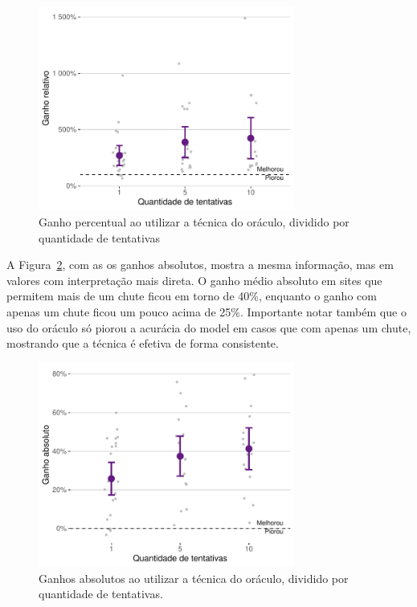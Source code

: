 \documentclass[12pt,twoside,brazilian]{book}
\begin{document}
\begin{figure}

{\centering \includegraphics[width=0.75\textwidth,height=\textheight]{./resultados_files/figure-pdf/fig-simulacao-geral-ntry-relativo-1.pdf}

}

\caption{\label{fig-simulacao-geral-ntry-relativo}Ganho percentual ao
utilizar a técnica do oráculo, dividido por quantidade de tentativas}

\end{figure}

A Figura~\ref{fig-simulacao-geral-ntry-absoluto}, com as os ganhos
absolutos, mostra a mesma informação, mas em valores com interpretação
mais direta. O ganho médio absoluto em sites que permitem mais de um
chute ficou em torno de 40\%, enquanto o ganho com apenas um chute ficou
um pouco acima de 25\%. Importante notar também que o uso do oráculo só
piorou a acurácia do model em casos que com apenas um chute, mostrando
que a técnica é efetiva de forma consistente.

\begin{figure}

{\centering \includegraphics[width=0.75\textwidth,height=\textheight]{./resultados_files/figure-pdf/fig-simulacao-geral-ntry-absoluto-1.pdf}

}

\caption{\label{fig-simulacao-geral-ntry-absoluto}Ganhos absolutos ao
utilizar a técnica do oráculo, dividido por quantidade de tentativas.}

\end{figure}
\end{document}
